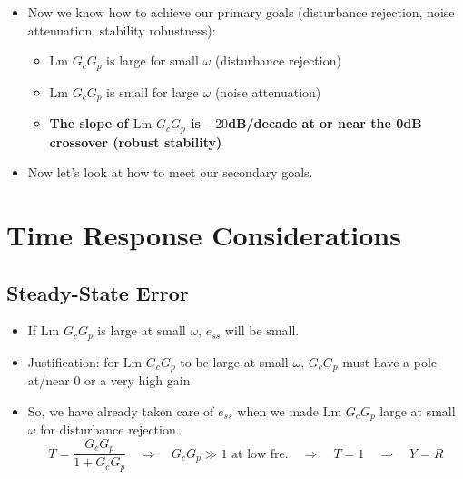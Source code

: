 \documentclass{book}
\newcommand{\Lm}{\textrm{Lm }}
\begin{document}
\begin{itemize}
\begin{center}
	\end{center}
	\item Now we know how to achieve our primary goals (disturbance rejection, noise attenuation, stability robustness):
	\begin{itemize}
		\item $ \Lm G_cG_p $ is large for small $ \omega $ (disturbance rejection)
		\item $ \Lm G_cG_p $ is small for large $ \omega $ (noise attenuation)
		\item \textbf{The slope of $ \Lm G_cG_p $ is $ -20 $dB/decade at or near the 0dB crossover (robust stability)}
	\end{itemize}
	\item Now let's look at how to meet our secondary goals.
\end{itemize}

\section*{Time Response Considerations}
\subsection*{Steady-State Error}
\begin{itemize}
	\item If $ \Lm G_cG_p $ is large at small $ \omega $, $ e_{ss} $ will be small.
	\item Justification: for $ \Lm G_cG_p $ to be large at small $ \omega $, $ G_cG_p $ must have a pole at/near 0 or a very high gain. %
	\item So, we have already taken care of $ e_{ss} $ when we made $ \Lm G_cG_p $ large at small $ \omega $ for disturbance rejection.
	\[ T=\frac{G_cG_p}{1+G_cG_p} \quad\Rightarrow\quad G_cG_p \gg 1 \text{ at low fre.} \quad\Rightarrow\quad T=1 \quad\Rightarrow\quad Y = R \]
\end{itemize}
\end{document}
